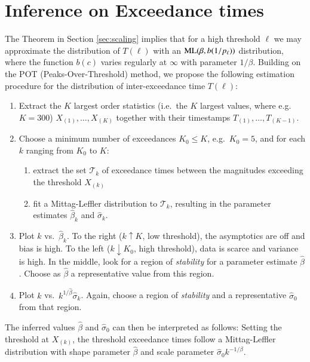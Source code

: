 \documentclass[]{elsarticle} %
\providecommand{\tightlist}{%
  \setlength{\itemsep}{0pt}\setlength{\parskip}{0pt}}
\begin{document}
\hypertarget{inference-on-exceedance-times}{%
\section{Inference on Exceedance
times}\label{inference-on-exceedance-times}}

The Theorem in Section \ref{sec:scaling} implies that for a high
threshold \(\ell\) we may approximate the distribution of \(T(\ell)\)
with an \({\rm ML}(\beta, b(1/p_{\ell}))\) distribution, where the
function \(b(c)\) varies regularly at \(\infty\) with parameter
\(1/\beta\). Building on the POT (Peaks-Over-Threshold) method, we
propose the following estimation procedure for the distribution of
inter-exceedance time \(T(\ell)\):

\begin{enumerate}
\def\labelenumi{\arabic{enumi}.}
\item
  Extract the \(K\) largest order statistics (i.e.~the \(K\) largest
  values, where e.g.~\(K = 300\)) \(X_{(1)}, \ldots, X_{(K)}\) together
  with their timestamps \(T_{(1)}, \ldots, T_{(K-1)}\).
\item
  Choose a minimum number of exceedances \(K_0\leq K\),
  e.g.~\(K_0 = 5\), and for each \(k\) ranging from \(K_0\) to \(K\):

  \begin{enumerate}
  \def\labelenumii{\alph{enumii})}
  \tightlist
  \item
    extract the set \(\mathcal T_k\) of exceedance times between the
    magnitudes exceeding the threshold \(X_{(k)}\)
  \item
    fit a Mittag-Leffler distribution to \(\mathcal T_k\), resulting in
    the parameter estimates \(\hat\beta_k\) and \(\hat \sigma_k\).
  \end{enumerate}
\item
  Plot \(k\) vs.~\(\hat \beta_k\). To the right (\(k \uparrow K\), low
  threshold), the asymptotics are off and bias is high. To the left
  (\(k \downarrow K_0\), high threshold), data is scarce and variance is
  high. In the middle, look for a region of \emph{stability} for a
  parameter estimate \(\hat \beta\). Choose as \(\hat \beta\) a
  representative value from this region.
\item
  Plot \(k\) vs.~\(k^{1/\hat \beta} \hat \sigma_k\). Again, choose a
  region of \emph{stability} and a representative \(\hat \sigma_0\) from
  that region.
\end{enumerate}

The inferred values \(\hat \beta\) and \(\hat \sigma_0\) can then be
interpreted as follows: Setting the threshold at \(X_{(k)}\), the
threshold exceedance times follow a Mittag-Leffler distribution with
shape parameter \(\hat \beta\) and scale parameter
\(\hat \sigma_0 k^{-1/\beta}\).
\end{document}
